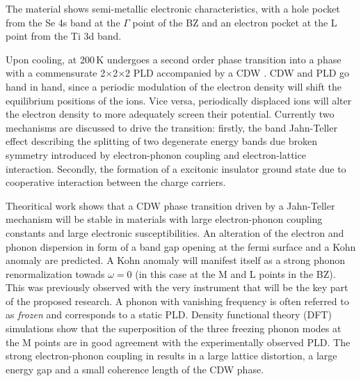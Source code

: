 The material shows semi-metallic electronic characteristics\cite{bachrach1976}, with a hole pocket from the Se 4s band at the $\Gamma$ point of the \ac{BZ} and an electron pocket at the L point from the Ti 3d band\cite{zunger1978}.

Upon cooling, at 200\,K \cite{disalvo1976} \ts\space undergoes a second order phase transition into a phase with a commensurate 2$\times$2$\times$2 \ac{PLD} accompanied by a \ac{CDW} \cite{rossnagel2011}.
\ac{CDW} and \ac{PLD} go hand in hand, since a periodic modulation of the electron density will shift the equilibrium positions of the ions.
Vice versa, periodically displaced ions will alter the electron density to more adequately screen their potential.
Currently two mechanisms are discussed to drive the transition: 
firstly, the band Jahn-Teller effect describing the splitting of two degenerate energy bands due broken symmetry introduced by electron-phonon coupling and electron-lattice interaction\cite{JT}.
Secondly, the formation of a excitonic insulator ground state due to cooperative interaction between the charge carriers\cite{EI}.

Theoritical work shows that a \ac{CDW} phase transition driven by a Jahn-Teller mechanism will be stable in materials with large electron-phonon coupling constants and large electronic susceptibilities\cite{friend1979}.
An alteration of the electron and phonon dispersion in form of a band gap opening at the fermi surface and a Kohn anomaly are predicted.
A Kohn anomaly will manifest itself as a strong phonon renormalization towads $\omega=0$\cite{kohn1959} (in this case at the M and L points in the \ac{BZ}).
This was previously observed with the very instrument that will be the key part of the proposed research\cite{otto2021}.
A phonon with vanishing frequency is often referred to as \emph{frozen} and corresponds to a static \ac{PLD}.
Density functional theory (DFT) simulations show that the superposition of the three freezing phonon modes at the M points are in good agreement with the experimentally observed \ac{PLD}\cite{kaneko2018}. %
The strong electron-phonon coupling in \ts\space results in a large lattice distortion, a large energy gap and a small coherence length of the \ac{CDW} phase\cite{haas1978,hildebrand2016}.


